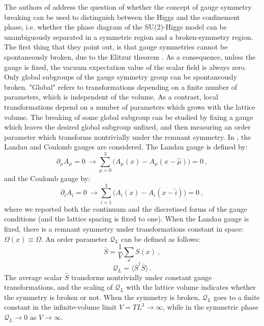 The authors of \cite{Caudy:2007sf} address the question of whether the concept of gauge symmetry breaking can be used to distinguish between the Higgs and the confinement phase, i.e. whether the phase diagram of the SU(2)-Higgs model can be unambiguously separated in a symmetric region and a broken-symmetry region. The first thing that they point out, is that gauge symmetries cannot be spontaneously broken, due to the Elitzur theorem \cite{Elitzur:1975im}. As a consequence, unless the gauge is fixed, the vacuum expectation value of the scalar field is always zero. Only global subgroups of the gauge symmetry group can be spontaneously broken. "Global" refers to transformations depending on a finite number of parameters, which is independent of the volume. As a contrast, local transformations depend on a number of parameters which grows with the lattice volume. The breaking of some global subgroup can be studied by fixing a gauge which leaves the desired global subgroup unfixed, and then measuring an order parameter which transforms nontrivially under the remnant symmetry. In \cite{Caudy:2007sf}, the Landau and Coulomb gauges are considered. The Landau gauge is defined by:
\begin{equation}
\partial_{\mu} A_{\mu} = 0 \:  \rightarrow \sum_{\mu =0}^3 \bigl( A_{\mu}(x) - A_{\mu}(x - \hat\mu) \bigr) = 0 \: ,
\end{equation}
%
and the Coulomb gauge by:
\begin{equation}
\partial_i A_i = 0 \: \rightarrow \sum_{i =1}^3 \bigl( A_i (x) - A_i(x - \hat i) \bigr) = 0 \: ,
\end{equation}
%
where we reported both the continuum and the discretised forms of the gauge conditions (and the lattice spacing is fixed to one). When the Landau gauge is fixed, there is a remnant symmetry under transformations constant in space: $\Omega (x) \equiv \Omega$. An order parameter $\mathcal Q_L$ can be defined as follows: 
\begin{equation}
\bar S = \frac{1}{V} \sum_{x} S(x) \: ,
\end{equation}
\begin{equation}
\mathcal Q_L = \langle \bar S^{\dagger} \bar S \rangle \: .
\end{equation}
%
The average scalar $\bar S$ transforms nontrivially under constant gauge transformations, and the scaling of $\mathcal Q_L$ with the lattice volume indicates whether the symmetry is broken or not. When the symmetry is broken, $\mathcal Q_L$ goes to a finite constant in the infinite-volume limit $V = TL^3 \to \infty$, while in the symmetric phase $\mathcal Q_L \to 0$ as $V \to \infty$.
